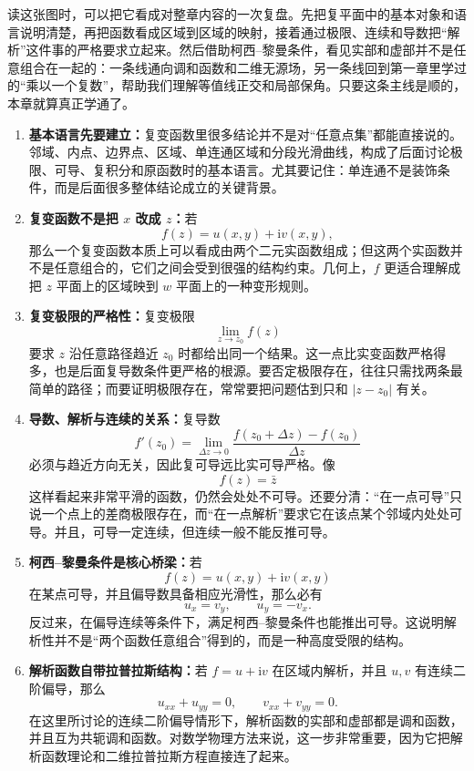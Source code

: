 读这张图时，可以把它看成对整章内容的一次复盘。先把复平面中的基本对象和语言说明清楚，再把函数看成区域到区域的映射，接着通过极限、连续和导数把``解析''这件事的严格要求立起来。然后借助柯西--黎曼条件，看见实部和虚部并不是任意组合在一起的：一条线通向调和函数和二维无源场，另一条线回到第一章里学过的``乘以一个复数''，帮助我们理解等值线正交和局部保角。只要这条主线是顺的，本章就算真正学通了。

\begin{zhongyao}[本章主要结论]
\raggedright
\begin{enumerate}
    \item \textbf{基本语言先要建立：}复变函数里很多结论并不是对``任意点集''都能直接说的。邻域、内点、边界点、区域、单连通区域和分段光滑曲线，构成了后面讨论极限、可导、复积分和原函数时的基本语言。尤其要记住：单连通不是装饰条件，而是后面很多整体结论成立的关键背景。

    \item \textbf{复变函数不是把 $x$ 改成 $z$：}若
    \[
        f(z)=u(x,y)+\mathrm{i}v(x,y),
    \]
    那么一个复变函数本质上可以看成由两个二元实函数组成；但这两个实函数并不是任意组合的，它们之间会受到很强的结构约束。几何上，$f$ 更适合理解成把 $z$ 平面上的区域映到 $w$ 平面上的一种变形规则。

    \item \textbf{复变极限的严格性：}复变极限
    \[
        \lim_{z\to z_0}f(z)
    \]
    要求 $z$ 沿任意路径趋近 $z_0$ 时都给出同一个结果。这一点比实变函数严格得多，也是后面复导数条件更严格的根源。要否定极限存在，往往只需找两条最简单的路径；而要证明极限存在，常常要把问题估到只和 $|z-z_0|$ 有关。

    \item \textbf{导数、解析与连续的关系：}复导数
    \[
        f'(z_0)=\lim_{\Delta z\to 0}\frac{f(z_0+\Delta z)-f(z_0)}{\Delta z}
    \]
    必须与趋近方向无关，因此复可导远比实可导严格。像
    \[
        f(z)=\bar z
    \]
    这样看起来非常平滑的函数，仍然会处处不可导。还要分清：``在一点可导''只说一个点上的差商极限存在，而``在一点解析''要求它在该点某个邻域内处处可导。并且，可导一定连续，但连续一般不能反推可导。

    \item \textbf{柯西--黎曼条件是核心桥梁：}若
    \[
        f(z)=u(x,y)+\mathrm{i}v(x,y)
    \]
    在某点可导，并且偏导数具备相应光滑性，那么必有
    \[
        u_x=v_y,\qquad u_y=-v_x.
    \]
    反过来，在偏导连续等条件下，满足柯西--黎曼条件也能推出可导。这说明解析性并不是``两个函数任意组合''得到的，而是一种高度受限的结构。

    \item \textbf{解析函数自带拉普拉斯结构：}若 $f=u+\mathrm{i}v$ 在区域内解析，并且 $u,v$ 有连续二阶偏导，那么
    \[
        u_{xx}+u_{yy}=0,\qquad v_{xx}+v_{yy}=0.
    \]
    在这里所讨论的连续二阶偏导情形下，解析函数的实部和虚部都是调和函数，并且互为共轭调和函数。对数学物理方法来说，这一步非常重要，因为它把解析函数理论和二维拉普拉斯方程直接连了起来。


\end{enumerate}
\end{zhongyao}
